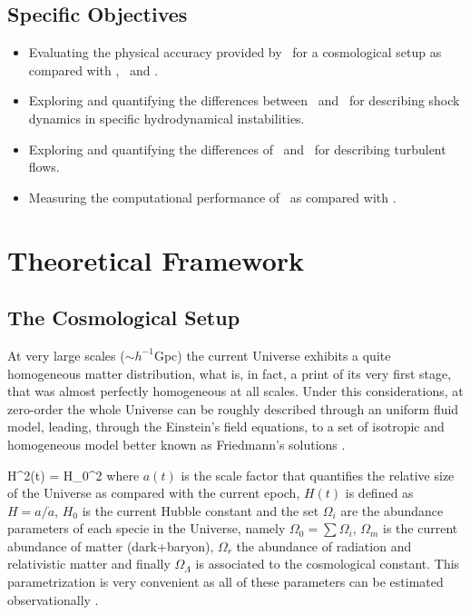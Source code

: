 \documentclass[a4,useAMS,usenatbib,usegraphicx,12pt]{article}
\begin{document}
\subsection*{Specific Objectives}
\begin{itemize}
\item Evaluating the physical accuracy provided by \VPH\ for a cosmological 
setup as compared with \AMR, \SPH\ and \AREPO.
\item Exploring and quantifying the differences between \VPH\ and \AMR\ for 
describing shock dynamics in specific hydrodynamical instabilities.
\item Exploring and quantifying the differences of \VPH\ and \SPH\ for 
describing turbulent flows.
\item Measuring the computational performance of \VPH\ as compared with \AREPO.
\end{itemize}


\section{Theoretical Framework}
\subsection*{The Cosmological Setup}
At very large scales ($\sim h^{-1}$Gpc) the current Universe exhibits a quite
homogeneous matter distribution, what is, in fact, a print of its very first 
stage, that was almost perfectly homogeneous at all scales. Under this 
considerations, at zero-order the whole Universe can be roughly described 
through an uniform fluid model, leading, through the Einstein's field equations,
to a set of isotropic and homogeneous model better known as Friedmann's 
solutions \citep{longair2008}.

{ H^2(t) = H_0^2 }
where $a(t)$ is the scale factor that quantifies the relative size of the 
Universe as compared with the current epoch, $H(t)$ is defined as $H = a/
\dot a$, $H_0$ is the current Hubble constant and the set $\Omega_i$ are the
abundance parameters of each specie in the Universe, namely $\Omega_0 = \sum 
\Omega_i$, $\Omega_m$ is the current abundance of matter (dark+baryon), 
$\Omega_r$ the abundance of radiation and relativistic matter and finally 
$\Omega_\Lambda$ is associated to the cosmological constant. This 
parametrization is very convenient as all of these parameters can be estimated
observationally \citep{Planck13XVI}.
\end{document}
